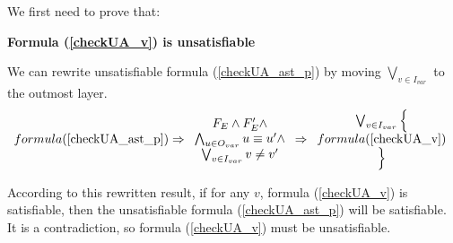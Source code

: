 \documentclass[journal]{IEEEtran}
\begin{document}
We first need to prove that:
\vspace{0.2cm}
\begin{theorem}[]\label{thm_checkUA_v}
\textbf{Formula (\ref{checkUA_v}) is unsatisfiable}
\end{theorem}
\begin{IEEEproof}
%
We can rewrite unsatisfiable formula (\ref{checkUA_ast_p}) by moving $\bigvee_{v\in I_{var}}$ to the outmost layer.
\begin{displaymath}\label{checkUA_rew}
formula (\ref{checkUA_ast_p})\Rightarrow
\begin{array}{c}
F_E\wedge F'_E\wedge \\
\bigwedge_{u\in O_{var}} u\equiv u'\wedge \\
\bigvee_{v\in I_{var}}v\ne v'
\end{array}
\Rightarrow
\begin{array}{c}
\bigvee_{v\in I_{var}}\Big\{\\
formula(\ref{checkUA_v})\\
\Big\}
\end{array}
\end{displaymath}

According to this rewritten result,
if for any $v$,
formula (\ref{checkUA_v}) is satisfiable,
then the unsatisfiable formula (\ref{checkUA_ast_p}) will be satisfiable.
It is a contradiction,
so formula (\ref{checkUA_v}) must be unsatisfiable.
\end{IEEEproof}
\end{document}
